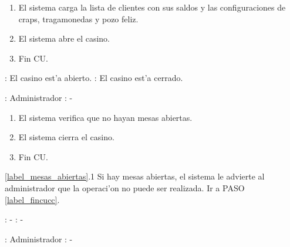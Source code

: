 \begin{enumerate}
\item El sistema carga la lista de clientes con sus saldos y las configuraciones de craps, tragamonedas y pozo feliz.
\item El sistema abre el casino.
\item Fin CU.
\end{enumerate}





: El casino est'a abierto. \newline
\indent{}: El casino est'a cerrado.

: Administrador \newline
\indent{}: -

\begin{enumerate}

\item El sistema verifica que no hayan mesas abiertas.
\item El sistema cierra el casino. \label{label_mesas_abiertas}
\item Fin CU. \label{label_fincucc}
\end{enumerate}


\ref{label_mesas_abiertas}.1 Si hay mesas abiertas, el sistema le advierte al administrador que la operaci'on no puede ser realizada. Ir a PASO \ref{label_fincucc}.




: - \newline
\indent{}: -

: Administrador \newline
\indent{}: -

